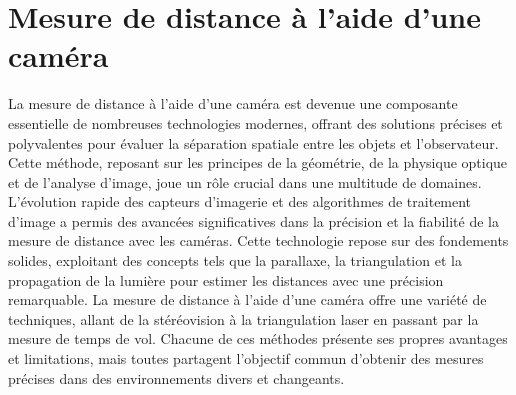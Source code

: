 

\newpage
\section{Mesure de distance à l'aide d'une caméra}

La mesure de distance à l'aide d'une caméra est devenue une composante essentielle de nombreuses technologies modernes, offrant des solutions précises et polyvalentes pour évaluer la séparation spatiale entre les objets et l'observateur. Cette méthode, reposant sur les principes de la géométrie, de la physique optique et de l'analyse d'image, joue un rôle crucial dans une multitude de domaines.  
L'évolution rapide des capteurs d'imagerie et des algorithmes de traitement d'image a permis des avancées significatives dans la précision et la fiabilité de la mesure de distance avec les caméras. Cette technologie repose sur des fondements solides, exploitant des concepts tels que la parallaxe, la triangulation et la propagation de la lumière pour estimer les distances avec une précision remarquable.
La mesure de distance à l'aide d'une caméra offre une variété de techniques, allant de la stéréovision à la triangulation laser en passant par la mesure de temps de vol. Chacune de ces méthodes présente ses propres avantages et limitations, mais toutes partagent l'objectif commun d'obtenir des mesures précises dans des environnements divers et changeants.

